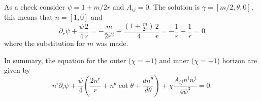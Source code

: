 \documentclass[a4paper,10pt]{article}
\begin{document}
As a check consider $\psi = 1 + m/2r$ and $A_{ij} = 0$. The solution is $\gamma = \left[m/2, \theta, 0\right]$, this means that $n = \left[1, 0\right]$ and
\begin{equation}
 \partial_r\psi + \frac{\psi}{4}\frac{2}{r} = -\frac{m}{2r^2} + \frac{\left(1 + \frac{m}{2r}\right) }{4} \frac{2}{r} = -\frac{1}{r} + \frac{1}{r} = 0
\end{equation}
where the substitution for $m$ was made.

In summary, the equation for the outer ($\chi = +1$) and inner ($\chi = -1$) horizon are given by
\begin{equation}
n^i\partial_i\psi + \frac{\psi}{4}\left( \frac{2n^r}{r} + n^\theta\cot\theta + \frac{dn^\theta}{d\theta}\right) + \chi \frac{A_{ij}n^in^j}{4\psi^3}= 0.
\end{equation}
\end{document}
